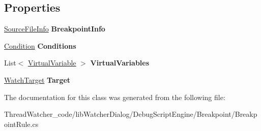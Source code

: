 \subsection*{Properties}
\begin{DoxyCompactItemize}
\item 
\hypertarget{classlib_watcher_dialog_1_1_debug_script_engine_1_1_breakpoint_1_1_breakpoint_rule_ad87ae2e878cbb265b08c093e3ea4bd30}{\hyperlink{classlib_watcher_dialog_1_1_debug_script_engine_1_1_property_1_1_source_file_info}{Source\+File\+Info} {\bfseries Breakpoint\+Info}}\label{classlib_watcher_dialog_1_1_debug_script_engine_1_1_breakpoint_1_1_breakpoint_rule_ad87ae2e878cbb265b08c093e3ea4bd30}

\item 
\hypertarget{classlib_watcher_dialog_1_1_debug_script_engine_1_1_breakpoint_1_1_breakpoint_rule_a780967b4d5ca577ffb018abb38004c56}{\hyperlink{classlib_watcher_dialog_1_1_debug_script_engine_1_1_property_1_1_condition}{Condition} {\bfseries Conditions}}\label{classlib_watcher_dialog_1_1_debug_script_engine_1_1_breakpoint_1_1_breakpoint_rule_a780967b4d5ca577ffb018abb38004c56}

\item 
\hypertarget{classlib_watcher_dialog_1_1_debug_script_engine_1_1_breakpoint_1_1_breakpoint_rule_a725e256af70e4f3fe7ac000e2f1aed51}{List$<$ \hyperlink{classlib_watcher_dialog_1_1_debug_script_engine_1_1_property_1_1_virtual_variable}{Virtual\+Variable} $>$ {\bfseries Virtual\+Variables}}\label{classlib_watcher_dialog_1_1_debug_script_engine_1_1_breakpoint_1_1_breakpoint_rule_a725e256af70e4f3fe7ac000e2f1aed51}

\item 
\hypertarget{classlib_watcher_dialog_1_1_debug_script_engine_1_1_breakpoint_1_1_breakpoint_rule_abdf1be7d7cc30e2c8464ed0efdda7a5f}{\hyperlink{classlib_watcher_dialog_1_1_debug_script_engine_1_1_property_1_1_watch_target}{Watch\+Target} {\bfseries Target}}\label{classlib_watcher_dialog_1_1_debug_script_engine_1_1_breakpoint_1_1_breakpoint_rule_abdf1be7d7cc30e2c8464ed0efdda7a5f}

\end{DoxyCompactItemize}


The documentation for this class was generated from the following file\+:\begin{DoxyCompactItemize}
\item 
Thread\+Watcher\+\_\+code/lib\+Watcher\+Dialog/\+Debug\+Script\+Engine/\+Breakpoint/Breakpoint\+Rule.\+cs\end{DoxyCompactItemize}
